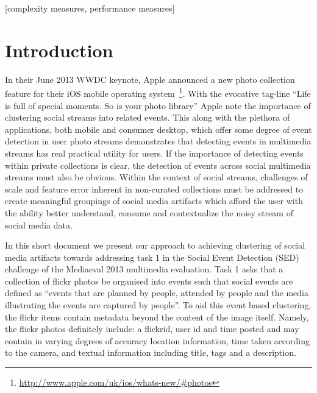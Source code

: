 \documentclass{../acm_proc_article-me11_tweaked}
\begin{document}
[complexity measures, performance measures]

\terms{}

\keywords{}

\section{Introduction}
In their June 2013 WWDC keynote, Apple announced a new photo collection feature for their iOS mobile operating system~\footnote{\url{http://www.apple.com/uk/ios/whats-new/#photos}}. With the evocative tag-line ``Life is full of special moments. So is your photo library'' Apple note the importance of clustering social streams into related events. This along with the plethora of applications, both mobile and consumer desktop, which offer some degree of event detection in user photo streams demonstrates that detecting events in multimedia streams has real practical utility for users. If the importance of detecting events within private collections is clear, the detection of events across social multimedia streams must also be obvious. Within the context of social streams, challenges of scale and feature error inherent in non-curated collections must be addressed to create meaningful groupings of social media artifacts which afford the user with the ability better understand, consume and contextualize the noisy stream of social media data. 

In this short document we present our approach to achieving clustering of social media artifacts towards addressing task 1 in the Social Event Detection (SED) challenge of the Mediaeval 2013 multimedia evaluation. Task 1 asks that a collection of flickr photos be organised into events such that social events are defined as ``events that are planned by people, attended by people and the media illustrating the events are captured by people''. To aid this event based clustering, the flickr items contain metadata beyond the content of the image itself. Namely, the flickr photos definitely include: a flickrid, user id and time posted and may contain in varying degrees of accuracy location information, time taken according to the camera, and textual information including title, tags and a description. 
\end{document}
